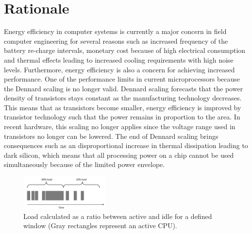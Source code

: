 \documentclass{article}
\begin{document}
\section{Rationale}
Energy efficiency in computer systems is currently a major concern in field computer engineering for several reasons such as increased frequency of the battery re-charge intervals, 
monetary cost because of high electrical consumption and thermal effects leading to increased cooling requirements with high noise levels. 
Furthermore, energy efficiency is also a concern for achieving increased performance.
One of the performance limits in current microprocessors because the Dennard scaling \cite{Dennard:74} is no longer valid. 
Dennard scaling forecasts that the power density of transistors stays constant as the manufacturing technology decreases. 
This means that as transistors become smaller, energy efficiency is improved by transistor technology such that the power remains in proportion to the area. 
In recent hardware, this scaling no longer applies since the voltage range used in transistors no longer can be lowered. 
The end of Dennard scaling brings consequences such as an disproportional increase in thermal dissipation leading to dark silicon, 
which means that all processing power on a chip cannot be used simultaneously because of the limited power envelope.\\

\begin{figure}
  \begin{center}
    \vspace{-1cm}
    \includegraphics[width=0.4\textwidth]{fig/workload.png}
  \end{center}
  \caption{Load calculated as a ratio between active and idle for a defined window (Gray rectangles represent an active CPU).}
  \label{fig:workload}
\end{figure}
\end{document}
